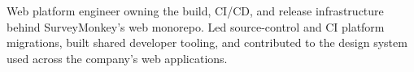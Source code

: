 Web platform engineer owning the build, CI/CD, and release infrastructure
behind SurveyMonkey's web monorepo. Led source-control and CI platform
migrations, built shared developer tooling, and contributed to the design
system used across the company's web applications.
